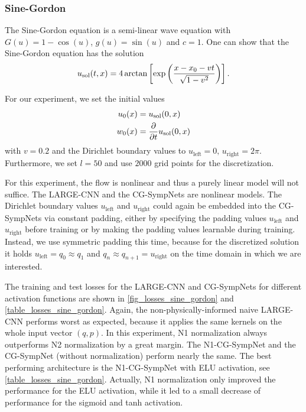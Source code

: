 \documentclass[twoside,a4paper]{article}
\begin{document}
\subsubsection{Sine-Gordon}

The Sine-Gordon equation is a 
semi-linear wave equation with $G(u) = 1 - \cos(u)$, $g(u) = \sin(u)$ and $c=1$.
One can show that the Sine-Gordon equation has the solution
\begin{equation*}
	u_{\text{sol}}(t,x) = 4 \arctan \left[ \exp \left( \frac{x-x_0-vt}{\sqrt{1-v^2}} \right) \right] 
	.
\end{equation*}

For our experiment, we set the initial values
\begin{align*}
	u_0(x) &= u_{\text{sol}}(0,x) \\
	w_0(x) &= \frac{\partial }{\partial t} u_{\text{sol}}(0,x)
\end{align*}
with $v=0.2$ and the Dirichlet boundary values to $u_{\text{left}} = 0, \, u_{\text{right}} = 2\pi$.
Furthermore, we set $l=50$ and use $2000$ grid points for the discretization.

For this experiment, the flow is nonlinear and thus a purely linear model will not suffice.
The LARGE-CNN and the CG-SympNets are nonlinear models.
The Dirichlet boundary values $u_{\text{left}}$ and $u_{\text{right}}$ could again
be embedded into the CG-SympNets via constant padding, 
either by specifying the padding values $u_{\text{left}}$ and $u_{\text{right}}$ before training
or by making the padding values learnable during training.
Instead, we use symmetric padding this time, because for the discretized solution it holds
$u_{\text{left}} = q_0 \approx q_1$ and $q_{n} \approx q_{n+1} = u_{\text{right}}$
on the time domain in which we are interested.

The training and test losses for the LARGE-CNN and CG-SympNets for different activation functions
are shown in \cref{fig_losses_sine_gordon} and \cref{table_losses_sine_gordon}.
Again, the non-physically-informed naive LARGE-CNN performs worst as expected, 
because it applies the same kernels on the whole input vector $(q,p)$. 
In this experiment, N1 normalization always outperforms N2 normalization by a great margin.
The N1-CG-SympNet and the CG-SympNet (without normalization) perform nearly the same.
The best performing architecture is the N1-CG-SympNet
with ELU activation, see \cref{table_losses_sine_gordon}. Actually, N1 normalization
only improved the performance for the ELU activation, while it led to a small 
decrease of performance for the sigmoid and tanh activation.
\end{document}
